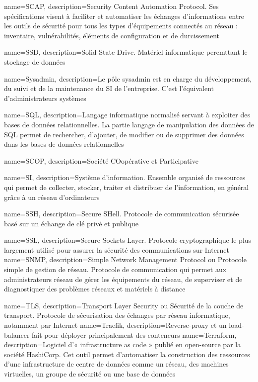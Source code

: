 {
    name=SCAP,
    description={Security Content Automation Protocol. Ses spécifications visent à faciliter et automatiser les échanges d'informations entre les outils de sécurité pour tous les types d'équipements connectés au réseau : inventaire, vulnérabilités, éléments de configuration et de durcissement}
}

{
    name=SSD,
    description={Solid State Drive. Matériel informatique peremttant le stockage de données}
}

{
    name=Sysadmin,
    description={Le pôle sysadmin est en charge du développement, du suivi et de la maintenance du SI de l'entreprise. C'est l'équivalent d'administrateurs systèmes}
}

{
    name=SQL,
    description={Langage informatique normalisé servant à exploiter des bases de données relationnelles. La partie langage de manipulation des données de SQL permet de rechercher, d'ajouter, de modifier ou de supprimer des données dans les bases de données relationnelles}
}

{
    name=SCOP,
    description={Société COopérative et Participative}
}

{
    name=SI,
    description={Système d'information. Ensemble organisé de ressources qui permet de collecter, stocker, traiter et distribuer de l'information, en général grâce à un réseau d'ordinateurs}
}

{
    name=SSH,
    description={Secure SHell. Protocole de communication sécurisée basé sur un échange de clé privé et publique}
}

{
    name=SSL,
    description={Secure Sockets Layer. Protocole cryptographique le plus largement utilisé pour assurer la sécurité des communications sur Internet}
}
{
    name=SNMP,
    description={Simple Network Management Protocol ou Protocole simple de gestion de réseau. Protocole de communication qui permet aux administrateurs réseau de gérer les équipements du réseau, de superviser et de diagnostiquer des problèmes réseaux et matériels à distance}
}

{
    name=TLS,
    description={Transport Layer Security ou Sécurité de la couche de transport. Protocole de sécurisation des échanges par réseau informatique, notamment par Internet}
}
{
    name=Traefik,
    description={Reverse-proxy et un load-balancer fait pour déployer principalement des conteneurs}
}
{
    name=Terraform,
    description={Logiciel d'« infrastructure as code » publié en open-source par la société HashiCorp. Cet outil permet d'automatiser la construction des ressources d'une infrastructure de centre de données comme un réseau, des machines virtuelles, un groupe de sécurité ou une base de données}
}

